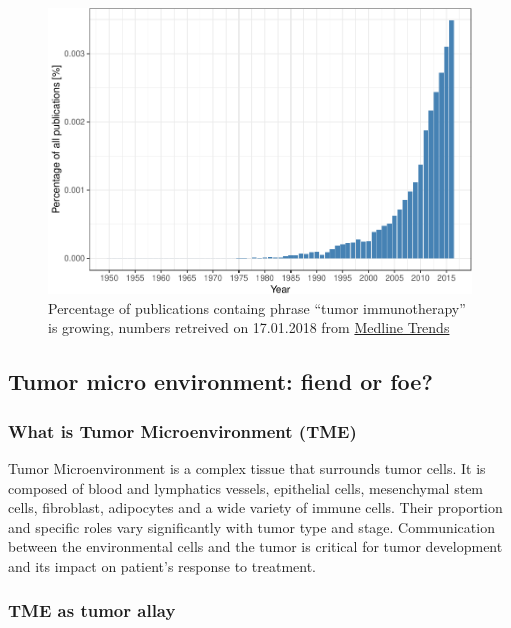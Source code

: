 \documentclass[12pt,]{book}
\theoremstyle{definition}
\theoremstyle{definition}
\theoremstyle{definition}
\theoremstyle{remark}
\begin{document}
\begin{figure}

{\centering \includegraphics[width=0.7\linewidth]{UCzPhDThesis_files/figure-latex/pubmedTME-1} 

}

\caption{Percentage of publications containg phrase
``tumor immunotherapy'' is growing, numbers retreived on 17.01.2018 from
\href{http://dan.corlan.net/medline-trend.html}{Medline Trends}
\citep{Corlan2004}}\label{fig:pubmedTME}
\end{figure}






\hypertarget{tumor-micro-environment-fiend-or-foe}{%
\subsection{Tumor micro environment: fiend or
foe?}\label{tumor-micro-environment-fiend-or-foe}}

\hypertarget{what-is-tumor-microenvironment-tme}{%
\subsubsection{What is Tumor Microenvironment
(TME)}\label{what-is-tumor-microenvironment-tme}}

Tumor Microenvironment is a complex tissue that surrounds tumor cells.
It is composed of blood and lymphatics vessels, epithelial cells,
mesenchymal stem cells, fibroblast, adipocytes and a wide variety of
immune cells. Their proportion and specific roles vary significantly
with tumor type and stage. Communication between the environmental cells
and the tumor is critical for tumor development and its impact on
patient's response to treatment.

\hypertarget{tme-as-tumor-allay}{%
\subsubsection{TME as tumor allay}\label{tme-as-tumor-allay}}
\end{document}
